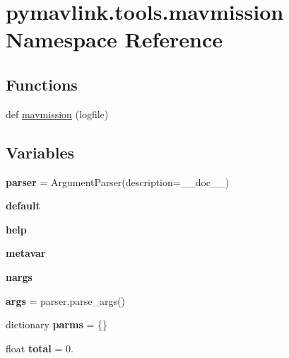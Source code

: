 \hypertarget{namespacepymavlink_1_1tools_1_1mavmission}{}\section{pymavlink.\+tools.\+mavmission Namespace Reference}
\label{namespacepymavlink_1_1tools_1_1mavmission}
\subsection*{Functions}
\begin{DoxyCompactItemize}
\item 
def \hyperlink{namespacepymavlink_1_1tools_1_1mavmission_a3c88671acc1dd08329c20a3b3e104678}{mavmission} (logfile)
\end{DoxyCompactItemize}
\subsection*{Variables}
\begin{DoxyCompactItemize}
\item 
\mbox{\label{namespacepymavlink_1_1tools_1_1mavmission_a783e72af1a8db42185949445362b3247}} 
{\bfseries parser} = Argument\+Parser(description=\+\_\+\+\_\+doc\+\_\+\+\_\+)
\item 
\mbox{\label{namespacepymavlink_1_1tools_1_1mavmission_a64691dc2e3eee904c09f166b3465d7d0}} 
{\bfseries default}
\item 
\mbox{\label{namespacepymavlink_1_1tools_1_1mavmission_af9b043f4f23b7216f0e777cd858eaacd}} 
{\bfseries help}
\item 
\mbox{\label{namespacepymavlink_1_1tools_1_1mavmission_a41bcbee85f5db6d41734d2e919a91b0c}} 
{\bfseries metavar}
\item 
\mbox{\label{namespacepymavlink_1_1tools_1_1mavmission_ac1d4e5b9176ca26036ee48cec931b152}} 
{\bfseries nargs}
\item 
\mbox{\label{namespacepymavlink_1_1tools_1_1mavmission_a4d9e4820244de01495a91d4862f575d8}} 
{\bfseries args} = parser.\+parse\+\_\+args()
\item 
\mbox{\label{namespacepymavlink_1_1tools_1_1mavmission_afb7a34f4e9ed1197f99f36f8ece8a1d6}} 
dictionary {\bfseries parms} = \{\}
\item 
\mbox{\label{namespacepymavlink_1_1tools_1_1mavmission_aa714e94d66d6efe561bc39e094364733}} 
float {\bfseries total} = 0.
\end{DoxyCompactItemize}


